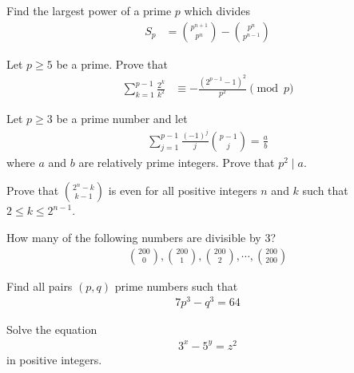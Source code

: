 \documentclass{subfile}
\begin{document}
	\begin{problem} %
		Find the largest power of a prime $p$ which divides
		\begin{align*}
			S_p
				& =\binom{p^{n+1}}{p^n}-\binom{p^{n}}{p^{n-1}}
		\end{align*}
	\end{problem}

	\begin{problem} %
		Let $p \geq 5$ be a prime. Prove that
			\begin{align*}
				\sum_{k=1}^{p-1}\frac{2^k}{k^2}
					& \equiv-\frac{(2^{p-1}-1)^2}{p^2}\pmod p
			\end{align*}
	\end{problem}

	\begin{problem} %
		Let $p\geq 3$ be a prime number and let
			\begin{align*}
				\sum_{j=1}^{p-1}\frac{(-1)^{j}}{j} \binom{p-1}{j} =\frac{a}{b}
			\end{align*}
		where $a$ and $b$ are relatively prime integers. Prove that $p^2\mid a$.
	\end{problem}

	\begin{problem} %
		Prove that $\binom{2^{n}-k}{k-1}$ is even for all positive integers $n$ and $k$ such that $2\le k\le 2^{n-1}$.
	\end{problem}

	\begin{problem} %
		How many of the following numbers are divisible by $3$?
		\begin{align*}
		\binom{200}{0}, \binom{200}{1}, \binom{200}{2}, \cdots, \binom{200}{200}
		\end{align*}
	\end{problem}


	\begin{problem} %
		Find all pairs $(p,q)$ prime numbers such that
			\begin{align*}
				7 p^3 - q^3 = 64
			\end{align*}
	\end{problem}

	\begin{problem}[BMO 2009] %
		Solve the equation
			\begin{align*}
				3^x - 5^y = z^2
			\end{align*}
		in positive integers.
	\end{problem}
\end{document}
